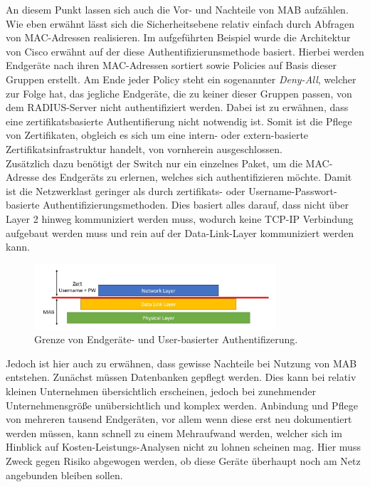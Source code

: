 \documentclass[conference]{IEEEtran}
\begin{document}
%


An diesem Punkt lassen sich auch die Vor- und Nachteile von MAB aufzählen. Wie eben erwähnt lässt sich die Sicherheitsebene relativ einfach durch Abfragen von MAC-Adressen realisieren. Im aufgeführten Beispiel wurde die Architektur von Cisco erwähnt auf der diese Authentifizierunsmethode basiert. Hierbei werden Endgeräte nach ihren MAC-Adressen sortiert sowie Policies auf Basis dieser Gruppen erstellt. Am Ende jeder Policy steht ein sogenannter \emph{Deny-All}, welcher zur Folge hat, das jegliche Endgeräte, die zu keiner dieser Gruppen passen, von dem RADIUS-Server nicht authentifiziert werden. Dabei ist zu erwähnen, dass eine zertifikatsbasierte Authentifierung nicht notwendig ist. Somit ist die Pflege von Zertifikaten, obgleich es sich um eine intern- oder extern-basierte Zertifikatsinfrastruktur handelt, von vornherein ausgeschlossen.\\

Zusätzlich dazu benötigt der Switch nur ein einzelnes Paket, um die MAC-Adresse des Endgeräts zu erlernen, welches sich authentifizieren möchte. Damit ist die Netzwerklast geringer als durch zertifikats- oder Username-Passwort-basierte Authentifizierungsmethoden. Dies basiert alles darauf, dass nicht über Layer 2 hinweg kommuniziert werden muss, wodurch keine TCP-IP Verbindung aufgebaut werden muss und rein auf der Data-Link-Layer kommuniziert werden kann.\\


\begin{figure}[hbt]
	\centering
	\includegraphics[width=9cm]{figures/MAB_Layer_2.jpg}
	\caption{Grenze von Endgeräte- und User-basierter Authentifizerung.}
	\label{fig:mab}
\end{figure}

Jedoch ist hier auch zu erwähnen, dass gewisse Nachteile bei Nutzung von MAB entstehen. Zunächst müssen Datenbanken gepflegt werden. Dies kann bei relativ kleinen Unternehmen übersichtlich erscheinen, jedoch bei zunehmender Unternehmensgröße unübersichtlich und komplex werden. Anbindung und Pflege von mehreren tausend Endgeräten, vor allem wenn diese erst neu dokumentiert werden müssen, kann schnell zu einem Mehraufwand werden, welcher sich im Hinblick auf Kosten-Leistungs-Analysen nicht zu lohnen scheinen mag. Hier muss Zweck gegen Risiko abgewogen werden, ob diese Geräte überhaupt noch am Netz angebunden bleiben sollen.\\
\end{document}
